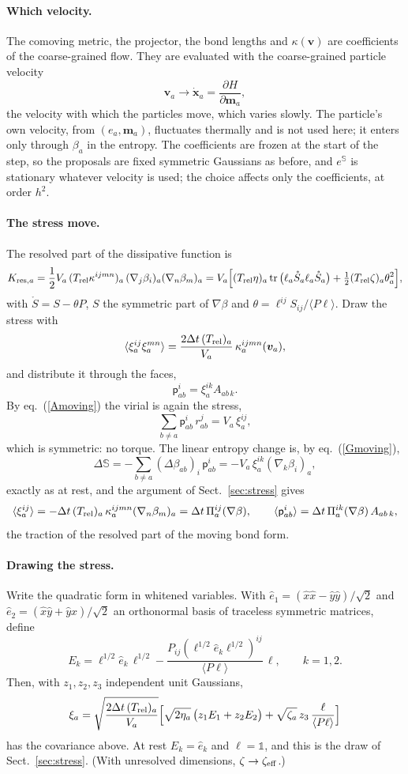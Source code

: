 \documentclass[11pt,aps,preprint,nofootinbib,superscriptaddress,tightenlines]{revtex4-2}
\def\st{\begin{equation}}
\def\stp{\end{equation}}
\def\Eq#1{eq.~(\ref{#1})}
\def\Sect#1{Sect.~\ref{#1}}
\newcommand{\one}{\mathds{1}}
\DeclareMathOperator{\tr}{tr}
\newcommand{\avg}[1]{\langle #1\rangle}
\let\oldparagraph\paragraph
\renewcommand{\paragraph}{\par\bigskip\oldparagraph}
\begin{document}
\paragraph{Which velocity.}  The comoving metric, the projector, the bond lengths
and $\kappa(\bm v)$ are coefficients of the coarse-grained flow.  They are evaluated
with the coarse-grained particle velocity
\st
\bm v_a\to\dot{\bm x}_a=\frac{\partial H}{\partial\bm m_a},
\stp
the velocity with which the particles move, which varies slowly.  The
particle's own velocity, from $(e_a,\bm m_a)$, fluctuates thermally and is not
used here; it enters only through $\beta_a$ in the entropy.  The coefficients
are frozen at the start of the step, so the proposals are fixed symmetric
Gaussians as before, and $e^{\mathbb S}$ is stationary whatever velocity is used;
the choice affects only the coefficients, at order $h^2$.

\paragraph{The stress move.}  The resolved part of the dissipative function is
\st
K_{{\rm res},a}=\frac12V_a\,(T_{\rm rel}\kappa^{ijmn})_a\,(\nabla_j\beta_i)_a(\nabla_n\beta_m)_a
=V_a\Big[(T_{\rm rel}\eta)_a\tr\big(\ell_a\mathring S_a\ell_a\mathring S_a\big)+\tfrac12(T_{\rm rel}\zeta)_a\theta_a^2\Big],
\stp
with $\mathring S=S-\theta P$, $S$ the symmetric part of $\nabla\beta$ and
$\theta=\ell^{ij}S_{ij}/\avg{P\ell}$.  Draw the stress with
\st
\avg{\xi_a^{ij}\xi_a^{mn}}=\frac{2\Delta t\,(T_{\rm rel})_a}{V_a}\,\kappa_a^{ijmn}(\bm v_a),
\stp
and distribute it through the faces,
\st
\mathsf p^i_{ab}=\xi_a^{ik}A_{ab\,k} .
\stp
By \Eq{Amoving} the virial is again the stress,
\st
\sum_{b\neq a}\mathsf p^i_{ab}\,r^j_{ab}=V_a\,\xi_a^{ij} ,
\stp
which is symmetric: no torque.  The linear entropy change is, by \Eq{Gmoving},
\st
\Delta\mathbb S=-\sum_{b\neq a}(\Delta\beta_{ab})_i\,\mathsf p^i_{ab}=-V_a\,\xi_a^{ik}(\nabla_k\beta_i)_a,
\stp
exactly as at rest, and the argument of \Sect{sec:stress} gives
\st
\avg{\xi_a^{ij}}=-\Delta t\,(T_{\rm rel})_a\,\kappa_a^{ijmn}(\nabla_n\beta_m)_a=\Delta t\,\Pi_a^{ij}(\nabla\beta),\qquad
\avg{\mathsf p^i_{ab}}=\Delta t\,\Pi_a^{ik}(\nabla\beta)\,A_{ab\,k} ,
\stp
the traction of the resolved part of the moving bond form.

\paragraph{Drawing the stress.}  Write the quadratic form in whitened
variables.  With $\hat e_1=(\hat x\hat x-\hat y\hat y)/\sqrt2$ and
$\hat e_2=(\hat x\hat y+\hat y\hat x)/\sqrt2$ an orthonormal basis of traceless
symmetric matrices, define
\st
E_k=\ell^{1/2}\hat e_k\,\ell^{1/2}-\frac{P_{ij}(\ell^{1/2}\hat e_k\ell^{1/2})^{ij}}{\avg{P\ell}}\,\ell ,
\qquad k=1,2 .
\stp
Then, with $z_1,z_2,z_3$ independent unit Gaussians,
\st
\xi_a=\sqrt{\frac{2\Delta t\,(T_{\rm rel})_a}{V_a}}\Big[\sqrt{2\eta_a}\,\big(z_1E_1+z_2E_2\big)
+\sqrt{\zeta_a}\,z_3\,\frac{\ell}{\avg{P\ell}}\Big]
\stp
has the covariance above.  At rest $E_k=\hat e_k$ and $\ell=\one$, and this is the
draw of \Sect{sec:stress}.  (With unresolved dimensions, $\zeta\to\zeta_{\rm eff}$.)
\end{document}
